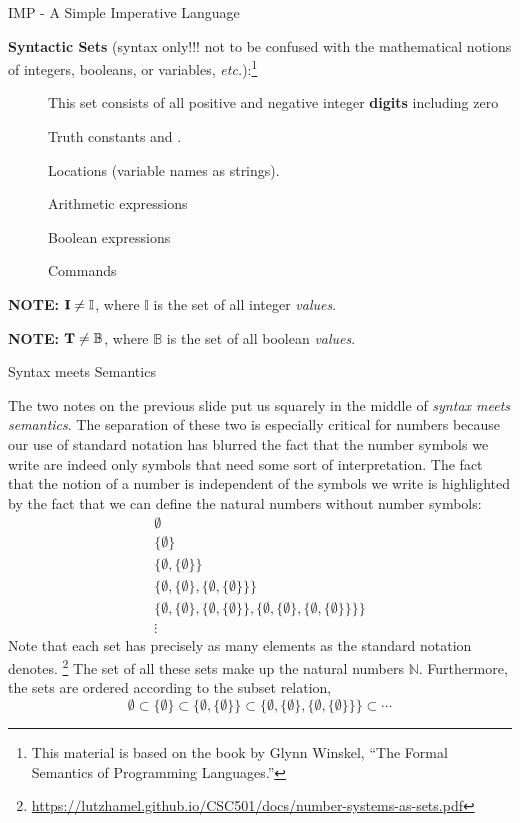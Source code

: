\documentclass{beamer}
\begin{document}
\begin{frame}{IMP - A Simple Imperative Language}

{\bf Syntactic Sets} (syntax only!!! not to be confused with the mathematical notions of integers, booleans, or variables, {\it etc.}):\footnote{This material is based on the book by Glynn Winskel, ``The Formal Semantics
of Programming Languages.''}
\begin{description}
\item[] This set consists of all positive and negative integer {\bf digits} including zero
\item[] Truth constants  and .
\item[] Locations (variable names as strings).
\item[] Arithmetic expressions
\item[] Boolean expressions
\item[] Commands
\end{description}

{\bf NOTE:} $\mbox{\bf I} \ne \mathbb{I}$, where $\mathbb{I}$ is the set of all integer {\em values}.

{\bf NOTE:} $\mbox{\bf T} \ne \mathbb{B}$, where $\mathbb{B}$ is the set of all boolean {\em values}.

\end{frame}

\begin{frame}{Syntax meets Semantics}
\scriptsize

The two notes on the previous slide put us squarely in the middle of {\em syntax meets semantics}.  The separation
of these two is especially critical for numbers because our use of standard notation has blurred the fact that the number
symbols we write are indeed only symbols that need some sort of interpretation.  The fact that the notion of a number is
independent of the symbols we write is highlighted by the fact that we can define the natural numbers without number symbols:
\[
\begin{array}{l}
\emptyset \\
\{\emptyset \} \\
\{ \emptyset , \{\emptyset \} \}\\
\{ \emptyset , \{\emptyset \}, \{ \emptyset , \{\emptyset \} \} \}\\
\{ \emptyset , \{\emptyset \}, \{ \emptyset , \{\emptyset \} \} , \{ \emptyset , \{\emptyset \}, \{ \emptyset , \{\emptyset \} \} \}\}\\
\vdots
\end{array}
\]
Note that each set has precisely as many elements as the standard notation denotes.
\footnote{\tiny\url{https://lutzhamel.github.io/CSC501/docs/number-systems-as-sets.pdf}}
The set of all these sets make up the natural numbers $\mathbb{N}$.
Furthermore, the sets are ordered according to the subset relation,
\[
\emptyset \subset \{\emptyset \} \subset \{ \emptyset , \{\emptyset \} \} \subset \{ \emptyset , \{\emptyset \}, \{ \emptyset , \{\emptyset \} \} \} \subset \cdots
\]

\end{frame}
\end{document}
